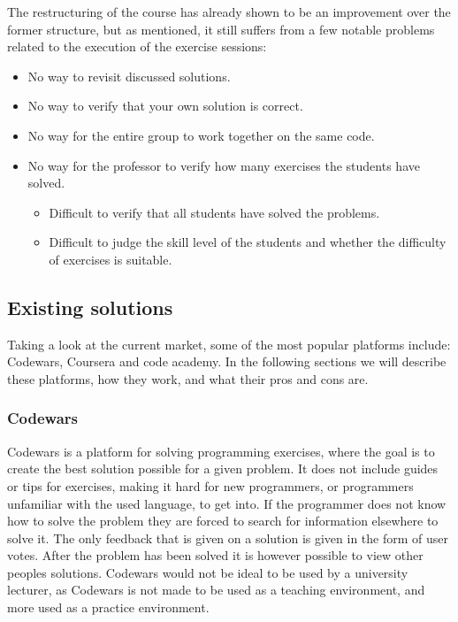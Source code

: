 The restructuring of the course has already shown to be an improvement over the former structure, but as mentioned, it still suffers from a few notable problems related to the execution of the exercise sessions:
\begin{itemize}
	\item No way to revisit discussed solutions.
	\item No way to verify that your own solution is correct.
	\item No way for the entire group to work together on the same code.
	\item No way for the professor to verify how many exercises the students have solved.
	\begin{itemize}
		\item Difficult to verify that all students have solved the problems.
		\item Difficult to judge the skill level of the students and whether the difficulty of exercises is suitable.
	\end{itemize}
\end{itemize}

\subsection{Existing solutions}
Taking a look at the current market, some of the most popular platforms include: Codewars, Coursera and code academy.
In the following sections we will describe these platforms, how they work, and what their pros and cons are.

\subsubsection*{Codewars}
Codewars is a platform for solving programming exercises, where the goal is to create the best solution possible for a given problem. It does not include guides or tips for exercises, making it hard for new programmers, or programmers unfamiliar with the used language, to get into. If the programmer does not know how to solve the problem they are forced to search for information elsewhere to solve it. The only feedback that is given on a solution is given in the form of user votes. After the problem has been solved it is however possible to view other peoples solutions\cite{Codewars}. 
Codewars would not be ideal to be used by a university lecturer, as Codewars is not made to be used as a teaching environment, and more used as a practice environment.

